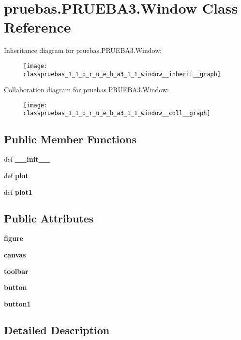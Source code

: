 \section{pruebas.\-P\-R\-U\-E\-B\-A3.\-Window \-Class \-Reference}
\label{classpruebas_1_1_p_r_u_e_b_a3_1_1_window}


\-Inheritance diagram for pruebas.\-P\-R\-U\-E\-B\-A3.\-Window\-:\nopagebreak
\begin{figure}[H]
\begin{center}
\leavevmode
\texttt{[image: classpruebas\_1\_1\_p\_r\_u\_e\_b\_a3\_1\_1\_window\_\_inherit\_\_graph]}
\end{center}
\end{figure}


\-Collaboration diagram for pruebas.\-P\-R\-U\-E\-B\-A3.\-Window\-:\nopagebreak
\begin{figure}[H]
\begin{center}
\leavevmode
\texttt{[image: classpruebas\_1\_1\_p\_r\_u\_e\_b\_a3\_1\_1\_window\_\_coll\_\_graph]}
\end{center}
\end{figure}
\subsection*{\-Public \-Member \-Functions}
\begin{DoxyCompactItemize}
\item 
def {\bf \-\_\-\-\_\-init\-\_\-\-\_\-}
\item 
def {\bf plot}
\item 
def {\bf plot1}
\end{DoxyCompactItemize}
\subsection*{\-Public \-Attributes}
\begin{DoxyCompactItemize}
\item 
{\bf figure}
\item 
{\bf canvas}
\item 
{\bf toolbar}
\item 
{\bf button}
\item 
{\bf button1}
\end{DoxyCompactItemize}


\subsection{\-Detailed \-Description}


